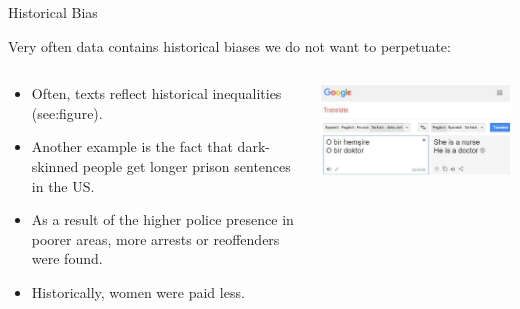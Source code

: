 \begin{vbframe}{Historical Bias}


Very often data contains historical biases we do not want to perpetuate:

\begin{columns}
\begin{column}{0.5\textwidth}
\begin{itemize}
   \item Often, texts reflect historical inequalities (see:figure). 
   \item Another example is the fact that dark-skinned people get longer prison sentences in the US.
   \item As a result of the higher police presence in poorer areas, more arrests or reoffenders were found.
   \item Historically, women were paid less.
\end{itemize}

\end{column}
\begin{column}{0.5\textwidth}  %
    \begin{center}
     \includegraphics[width=\textwidth]{figure_man/biases-googletranslate.png}
     \end{center}
\end{column}
\end{columns}

\end{vbframe}

